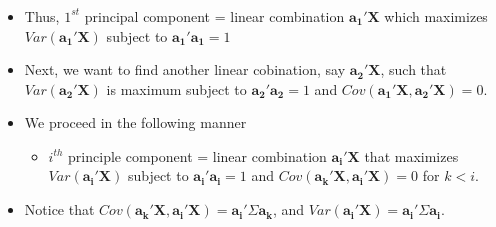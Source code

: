 \documentclass[10pt]{beamer} %
\begin{document}
\begin{frame}
   \frametitle{}
   \begin{itemize}
      \item Thus, $1^{st}$ principal component = linear combination
         $\boldsymbol{a_{1}'}\boldsymbol{X}$ which maximizes
         $Var(\boldsymbol{a_{1}'}\boldsymbol{X})$ subject to
         $\boldsymbol{a_{1}'}\boldsymbol{a_{1}}=1$
         \vspace{0.25cm}
      \item Next, we want to find another linear cobination, say
         $\boldsymbol{a_{2}'}\boldsymbol{X}$, such that
         $Var(\boldsymbol{a_{2}'}\boldsymbol{X})$ is maximum subject to
         $\boldsymbol{a_{2}'}\boldsymbol{a_2}=1$ and
         $Cov(\boldsymbol{a_{1}'}\boldsymbol{X},\boldsymbol{a_{2}'}\boldsymbol{X})
         = 0$.
         \vspace{0.25cm}
      \item We proceed in the following manner	
         \begin{itemize}
            \item $i^{th}$ principle component = linear combination
               $\boldsymbol{a_{i}'}\boldsymbol{X}$ that maximizes
               $Var(\boldsymbol{a_{i}'}\boldsymbol{X})$ subject to
               $\boldsymbol{a_{i}'}\boldsymbol{a_i}=1$ and
               $Cov(\boldsymbol{a_{k}'}\boldsymbol{X},\boldsymbol{a_{i}'}\boldsymbol{X})
               = 0$ for $k<i$.
         \end{itemize}
         \vspace{0.25cm}
      \item Notice that
         $Cov(\boldsymbol{a_{k}'}\boldsymbol{X},\boldsymbol{a_{i}'}\boldsymbol{X})
         = \boldsymbol{a_{i}'}\Sigma\boldsymbol{a_k}$, and
         $Var(\boldsymbol{a_{i}'}\boldsymbol{X}) =
         \boldsymbol{a_{i}'}\Sigma\boldsymbol{a_i}$.
   \end{itemize}	
\end{frame}
\end{document}
